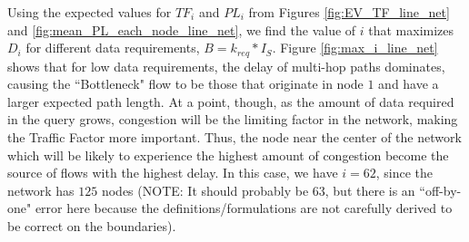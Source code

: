Using the expected values for $TF_i$ and $PL_i$ from Figures \ref{fig:EV_TF_line_net} and \ref{fig:mean_PL_each_node_line_net}, we find the value of $i$ that maximizes $D_i$ for different data requirements, $B = k_{req}*I_S$.  Figure \ref{fig:max_i_line_net} shows that for low data requirements, the delay of multi-hop paths dominates, causing the ``Bottleneck" flow to be those that originate in node $1$ and have a larger expected path length.  At a point, though, as the amount of data required in the query grows, congestion will be the limiting factor in the network, making the Traffic Factor more important.  Thus, the node near the center of the network which will be likely to experience the highest amount of congestion become the source of flows with the highest delay.  In this case, we have $i = 62$, since the network has $125$ nodes (NOTE: It should probably be 63, but there is an ``off-by-one" error here because the definitions/formulations are not carefully derived to be correct on the boundaries).

